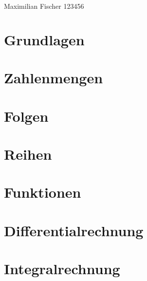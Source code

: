 \documentclass[a4paper, 8pt]{extarticle} %
\begin{document}
\setlength{\abovedisplayskip}{0.5pt}
\setlength{\belowdisplayskip}{0.5pt}
\renewcommand{\arraystretch}{0.5}
\titlespacing*{\section}
{0pt}{-2pt}{-2pt}
\titlespacing*{\subsection}
{0pt}{-2pt}{-2pt}
\titlespacing*{\subsubsection}
{0pt}{-2pt}{-2pt}



\hfill Maximilian Fischer 123456%
\begin{multicols*}{4}
\section*{Grundlagen}

\section*{Zahlenmengen}

\section*{Folgen}

\section*{Reihen}

\section*{Funktionen}

\section*{Differentialrechnung}

\section*{Integralrechnung}

\end{multicols*}
\end{document}
